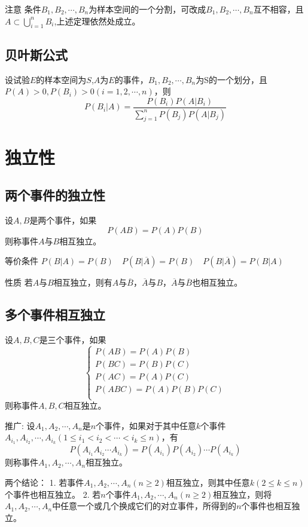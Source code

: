 注意
条件$B_1,B_2,\cdots,B_n$为样本空间的一个分割，可改成$B_1,B_2,\cdots,B_n$互不相容，且$A \subset \bigcup\limits_{i=1}^{n} B_i $,上述定理依然处成立。

\subsection{贝叶斯公式}
\begin{theorem}
    设试验$E$的样本空间为$S$,$A$为$E$的事件，$B_1,B_2,\cdots,B_n$为S的一个划分，且$P(A) > 0,P(B_i) > 0(i = 1,2,\cdots,n)$，则$$P({B_i}|\left. A \right.) = \frac{{P({B_i})P(\left. A \right|{B_i})}}{{\sum\limits_{j = 1}^n {P({B_j})P(\left. A \right|{B_j})} }}$$
\end{theorem}


\section{独立性}
\subsection{两个事件的独立性}
\begin{definition}
    设$A,B$是两个事件，如果$$P(AB) = P(A)P(B)$$则称事件$A$与$B$相互独立。
\end{definition}

等价条件 $P(B|A) = P(B) \quad P(B|\overline A)=P(B) \quad P(B|\overline A)=P(B|A)$

性质 若$A$与$B$相互独立，则有$A$与$\overline B$，$\overline A$与$B$，$\overline A$与$\overline B$也相互独立。

\subsection{多个事件相互独立}
\begin{definition}
    设$A,B,C$是三个事件，如果
    $$\left\{ \begin{gathered}
            P(AB) = P(A)P(B) \\
            P(BC) = P(B)P(C) \\
            P(AC) = P(A)P(C) \\
            P(ABC) = P(A)P(B)P(C) \\
        \end{gathered}  \right.$$
    则称事件$A,B,C$相互独立。
\end{definition}

推广:
设$A_1,A_2,\cdots,A_n$是$n$个事件，如果对于其中任意$k$个事件$A_{i_1},A_{i_2},\cdots,A_{i_k}(1 \le i_1 < i_2 < \cdots < i_k \le n)$，有$$P(A_{i_1}A_{i_2}\cdots A_{i_k}) = P(A_{i_1})P(A_{i_2})\cdots P(A_{i_k})$$则称事件$A_1,A_2,\cdots,A_n$相互独立。

两个结论：
1. 若事件$A_1,A_2,\cdots,A_n(n \ge 2)$相互独立，则其中任意$k(2 \le k \le n)$个事件也相互独立。
2. 若$n$个事件$A_1,A_2,\cdots,A_n(n \ge 2)$相互独立，则将$A_1,A_2,\cdots,A_n$中任意一个或几个换成它们的对立事件，所得到的$n$个事件也相互独立。